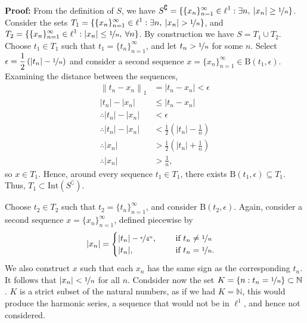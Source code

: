 \documentclass[a4paper,11pt]{article}
\newcommand{\norm}[1]{\left\lVert#1\right\rVert}
\newcommand{\ds}{\displaystyle}
\begin{document}
{{\begin{enumerate}[leftmargin=*]
			\bigbreak

			\textbf{Proof:} From the definition of $\ds{S}$, we have $\ds{S^{\complement} = \{\{x_n\}_{n=1}^{\infty} \in \ell^1 : \exists n, \: |x_n| \geq \nicefrac{1}{n}\}}$. Consider the sets $\ds{T_1 = \{\{x_n\}_{n=1}^{\infty} \in \ell^1 : \exists n, \: |x_n| > \nicefrac{1}{n}\}}$, and $\ds{T_2 = \{\{x_n\}_{n=1}^{\infty} \in \ell^1 : |x_n| \leq \nicefrac{1}{n}, \: \forall n\}}$. By construction we have $\ds{S = T_1 \cup T_2}$. 
			\bigbreak
		Choose $\ds{t_1 \in T_1}$ such that $\ds{t_1 = \{t_n\}_{n=1}^{\infty}}$, and let $\ds{t_n > \nicefrac{1}{n}}$ for some $\ds{n}$. Select $\ds{\epsilon = \frac{1}{2}\left(|t_n| - \nicefrac{1}{n}\right)}$ and consider a second sequence $\ds{x = \{x_n\}_{n=1}^{\infty} \in \text{B}(t_1, \epsilon)}$. Examining the distance between the sequences,
		\begin{align*}
			\norm{t_n - x_n}_1 & = |t_n - x_n| < \epsilon \\
			|t_n| - |x_n| & \leq |t_n - x_n| \\
			\therefore |t_n| - |x_n| & < \epsilon \\
			\therefore |t_n| - |x_n| & < \frac{1}{2}\left(|t_n| - \frac{1}{n}\right) \\
			\therefore |x_n| & > \frac{1}{2}\left(|t_n| + \frac{1}{n}\right) \\
			\therefore |x_n| & > \frac{1}{n},
		\end{align*}
		so $\ds{x \in T_1}$. Hence, around every sequence $\ds{t_1 \in T_1}$, there exists $\ds{\text{B}(t_1, \epsilon) \subseteq T_1}$. Thus, $\ds{T_1 \subset \text{Int}(S^{\complement})}$.

		\bigbreak
		
		Choose $\ds{t_2 \in T_2}$ such that $\ds{t_2 = \{t_n\}_{n=1}^{\infty}}$, and consider $\ds{\text{B}(t_2,\epsilon)}$. Again, consider a second sequence $\ds{x = \{x_n\}_{n=1}^{\infty}}$, defined piecewise by 
		\begin{align*}
			|x_n| & = 
			\begin{cases}
				|t_n| - \nicefrac{\epsilon}{4^n}, & \hspace{5mm} \text{if } t_n \neq \nicefrac{1}{n} \\
				|t_n|, & \hspace{5mm} \text{if } t_n = \nicefrac{1}{n}. \\
			\end{cases}
		\end{align*}
		We also construct $\ds{x}$ such that each $\ds{x_n}$ has the same sign as the corresponding $\ds{t_n}$. It follows that $\ds{|x_n| < \nicefrac{1}{n}}$ for all $\ds{n}$. Condsider now the set $\ds{K = \{n : t_n = \nicefrac{1}{n}\} \subset \mathbb{N}}$. $\ds{K}$ is a strict subset of the natural numbers, as if we had $\ds{K = \mathbb{N}}$, this would produce the harmonic series, a sequence that would not be in $\ds{\ell^1}$, and hence not considered. 


\end{enumerate}}}
\end{document}
